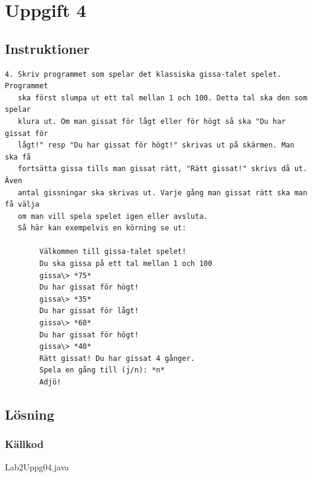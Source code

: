 \section{Uppgift 4}\label{sec:uppg04}

\subsection{Instruktioner}
\begin{verbatim}
4. Skriv programmet som spelar det klassiska gissa-talet spelet.  Programmet
   ska först slumpa ut ett tal mellan 1 och 100. Detta tal ska den som spelar
   klura ut. Om man gissat för lågt eller för högt så ska "Du har gissat för
   lågt!" resp "Du har gissat för högt!" skrivas ut på skärmen. Man ska få
   fortsätta gissa tills man gissat rätt, "Rätt gissat!" skrivs då ut. Även
   antal gissningar ska skrivas ut. Varje gång man gissat rätt ska man få välja
   om man vill spela spelet igen eller avsluta.
   Så här kan exempelvis en körning se ut:

        Välkommen till gissa-talet spelet!
        Du ska gissa på ett tal mellan 1 och 100
        gissa\> *75*
        Du har gissat för högt!
        gissa\> *35*
        Du har gissat för lågt!
        gissa\> *60*
        Du har gissat för högt!
        gissa\> *40*
        Rätt gissat! Du har gissat 4 gånger.
        Spela en gång till (j/n): *n*
        Adjö!
\end{verbatim}


\subsection{Lösning}

\subsubsection{Källkod}
\caption{Lab2Uppg04.java}
\label{src:uppg04}


